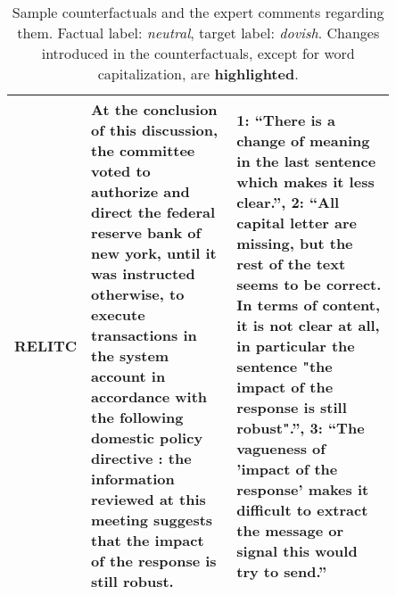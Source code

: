 \documentclass[11pt]{article}
\begin{document}
\begin{table*}[!htb]
{\begin{tabular}{c|p{0.4\linewidth}|p{0.45\linewidth}|}
\multicolumn{1}{|l|}{RELITC}    & At the conclusion of this discussion, the committee voted to authorize and direct the federal reserve bank of new york, until it was instructed otherwise, to execute transactions in the system account in accordance with the following domestic policy directive : the information reviewed at this meeting suggests that the \textbf{impact of the response} is still robust.        & \textbf{1:} ``There is a change of meaning in the last sentence which makes it less clear.'', \textbf{2:} ``All capital letter are missing, but the rest of the text seems to be correct. In terms of content, it is not clear at all, in particular the sentence "the impact of the response is still robust".'', \textbf{3:} ``The vagueness of 'impact of the response' makes it difficult to extract the message or signal this would try to send.'' \\ \hline
\end{tabular}}
\caption{Sample counterfactuals and the expert comments regarding them. Factual label: \textit{neutral}, target label: \textit{dovish}. Changes introduced in the counterfactuals, except for word capitalization, are \textbf{highlighted}.}
\label{tab:sample-expert-comments}
\end{table*}
\end{document}
